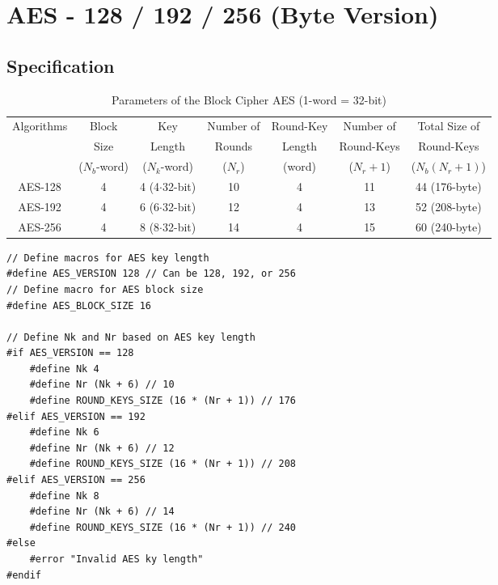 \chapter{AES - 128 / 192 / 256 (Byte Version)}

\section{Specification}

\begin{table}[h!]\centering\renewcommand{\arraystretch}{1.25} %
	\caption{Parameters of the Block Cipher AES (1-word = 32-bit)}
	\begin{tabular*}{\textwidth}{@{\extracolsep{\fill}}c||cccccc}
		\toprule[1.2pt]
		\multirow{3}{*}{Algorithms} & Block & Key & Number of & Round-Key & Number of & Total Size of\\
		& Size & Length & Rounds &  Length & Round-Keys & Round-Keys \\
		& ($N_b$-word) & ($N_k$-word) & ($N_r$)& (word) & ($N_r+1$)& ($N_b(N_r+1)$)\\
		\hline\hline
		AES-128 & 4 & 4 (4$\cdot$32-bit) & 10 & 4 & 11 & 44 (176-byte) \\
		AES-192 & 4 & 6 (6$\cdot$32-bit) & 12 & 4 & 13 & 52 (208-byte) \\
		AES-256 & 4 & 8 (8$\cdot$32-bit) & 14 & 4 & 15 & 60 (240-byte) \\
		\bottomrule[1.2pt]
	\end{tabular*}
\end{table}

\begin{lstlisting}[style=C, caption={Configuration},captionpos=t]
// Define macros for AES key length
#define AES_VERSION 128 // Can be 128, 192, or 256
// Define macro for AES block size
#define AES_BLOCK_SIZE 16

// Define Nk and Nr based on AES key length
#if AES_VERSION == 128
	#define Nk 4
	#define Nr (Nk + 6) // 10
	#define ROUND_KEYS_SIZE (16 * (Nr + 1)) // 176
#elif AES_VERSION == 192
	#define Nk 6
	#define Nr (Nk + 6) // 12
	#define ROUND_KEYS_SIZE (16 * (Nr + 1)) // 208
#elif AES_VERSION == 256
	#define Nk 8
	#define Nr (Nk + 6) // 14
	#define ROUND_KEYS_SIZE (16 * (Nr + 1)) // 240
#else
	#error "Invalid AES ky length"
#endif
\end{lstlisting}


